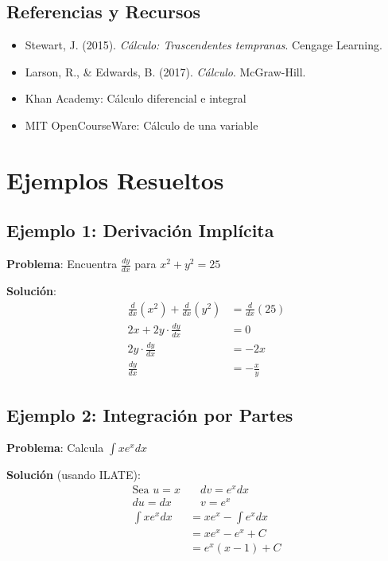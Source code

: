 \documentclass{article}
\newcommand{\formula}[1]{\ensuremath{#1}}
\begin{document}
\subsection*{Referencias y Recursos}
\begin{itemize}
    \item Stewart, J. (2015). \textit{Cálculo: Trascendentes tempranas}. Cengage Learning.
    \item Larson, R., \& Edwards, B. (2017). \textit{Cálculo}. McGraw-Hill.
    \item Khan Academy: Cálculo diferencial e integral
    \item MIT OpenCourseWare: Cálculo de una variable
\end{itemize}

\newpage
\appendix
\section{Ejemplos Resueltos}

\subsection{Ejemplo 1: Derivación Implícita}
\begin{examplebox}
\textbf{Problema}: Encuentra \formula{\frac{dy}{dx}} para \formula{x^2 + y^2 = 25}

\textbf{Solución}:
\begin{align*}
\frac{d}{dx}(x^2) + \frac{d}{dx}(y^2) &= \frac{d}{dx}(25) \\
2x + 2y \cdot \frac{dy}{dx} &= 0 \\
2y \cdot \frac{dy}{dx} &= -2x \\
\frac{dy}{dx} &= -\frac{x}{y}
\end{align*}
\end{examplebox}

\subsection{Ejemplo 2: Integración por Partes}
\begin{examplebox}
\textbf{Problema}: Calcula \formula{\int x e^x dx}

\textbf{Solución} (usando ILATE):
\begin{align*}
\text{Sea } u = x &\quad dv = e^x dx \\
du = dx &\quad v = e^x \\
\int x e^x dx &= x e^x - \int e^x dx \\
&= x e^x - e^x + C \\
&= e^x(x - 1) + C
\end{align*}
\end{examplebox}
\end{document}
